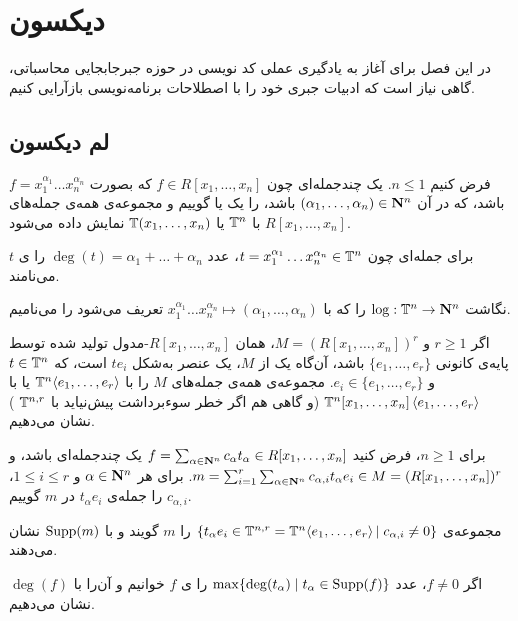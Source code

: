 
\chapter{دیکسون}
در این فصل برای آغاز به یادگیری عملی کد نویسی در حوزه جبرجابجایی محاسباتی، گاهی نیاز است که ادبیات جبری خود را با اصطلاحات برنامه‌نویسی بازآرایی کنیم.
\section{لم دیکسون}
فرض کنیم
$n\le 1$.
یک چندجمله‌ای چون
$f\in R[x_1,\dots,x_n]$
که بصورت
$f=x_1^{\alpha_1}\dots x_n^{\alpha_n}$
باشد، که در آن 
$(\alpha_1,\dots,\alpha_n)\in{\bf N}^n$
باشد، را یک  یا  گوییم و مجموعه‌ی همه‌ی جمله‌های 
$R[x_1,\dots,x_n]$
با
${\Bbb T}^n$ 
یا
${\Bbb T}(x_1,\dots,x_n)$
نمایش داده می‌شود.

برای جمله‌ای چون
$t=x_1^{\alpha_1}\dots x_n^{\alpha_n}\in{\Bbb T}^n$،
عدد
$\deg(t)=\alpha_1+\dots+\alpha_n$
را ی $t$ می‌نامند.

نگاشت
$\log:{\Bbb T}^n\to{\bf N}^n$
را که با 
$x_1^{\alpha_1}\dots x_n^{\alpha_n}\mapsto(\alpha_1,\dots,\alpha_n)$
تعریف می‌شود را  می‌نامیم.

اگر
$r\ge 1$
و
$M=(R[x_1,\dots,x_n])^r$،
همان $R[x_1,\dots,x_n]$-مدول تولید شده توسط پایه‌ی کانونی
$\{e_1,\dots,e_r\}$
باشد، آن‌گاه یک   از $M$، یک عنصر به‌شکل
$te_i$
است، که 
$t\in{\Bbb T}^n$
و
$e_i\in\{e_1,\dots,e_r\}$.
مجموعه‌ی همه‌ی جمله‌های $M$ را با
${\Bbb T}^n\!\left<e_1,\dots,e_r\right>$
یا با
${\Bbb T}^n[x_1,\dots,x_n]\left<e_1,\dots,e_r\right>$
(و گاهی هم اگر خطر سوءبرداشت پیش‌نیاید با
${\Bbb T}^{n,r}$
)
نشان می‌دهیم.

برای $n\ge1$، فرض کنید 
$f=\sum_{\alpha\in{\bf N}^n}c_\alpha t_\alpha\in R[x_1,\dots,x_n]$
یک چندجمله‌ای باشد، و
$m=\sum_{i=1}^r\sum_{\alpha\in{\bf N}^n}c_{\alpha,i} t_\alpha e_i\in M=(R[x_1,\dots,x_n])^r$.
برای هر
$\alpha\in{\bf N}^n$
و 
$1\le i\le r$،
$c_{\alpha,i}$
را  جمله‌ی $t_\alpha e_i$ در $m$ گوییم.

مجموعه‌ی
$\{t_\alpha e_i\in {\Bbb T}^{n,r}={\Bbb T}^n\!\left<e_1,\dots,e_r\right>|\; c_{\alpha,i}\ne 0\}$
را  $m$ گویند و با
$\operatorname{Supp}(m)$
نشان می‌دهند.

اگر 
$f\ne 0$،
عدد 
$\max\{\deg(t_\alpha)\;|\;t_\alpha\in\operatorname{Supp}(f)\}$
را ی $f$ خوانیم و آن‌را با
$\deg(f)$
نشان می‌دهیم.
